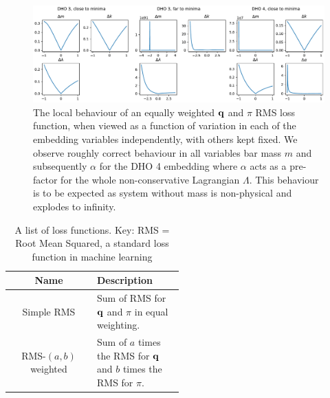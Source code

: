 \begin{figure}[t]
  \label{fig:loss-function-behaviour}
  \includegraphics[width=\textwidth]{figures/loss-function-behaviour.pdf}
  \caption{The local behaviour of an equally weighted $\vb{q}$ and $\pi$ RMS loss function, when viewed as a function of variation in each of the embedding variables independently, with others kept fixed. We observe roughly correct behaviour in all variables bar mass $m$ and subsequently $\alpha$ for the DHO 4 embedding where $\alpha$ acts as a pre-factor for the whole non-conservative Lagrangian $\Lambda$. This behaviour is to be expected as system without mass is non-physical and explodes to infinity.}
\end{figure}

\begin{table}
\label{table:loss-fns}
\centering
\caption{A list of loss functions. Key: RMS = Root Mean Squared, a standard loss function in machine learning%
}
\begin{tabular}{c|p{0.5\linewidth}}
  Name & Description \\
  \hline
  Simple RMS & Sum of RMS for $\vb{q}$ and $\pi$ in equal weighting. \\
  RMS-$(a, b)$ weighted & Sum of $a$ times the RMS for $\vb{q}$ and $b$ times the RMS for $\pi$. \\
\end{tabular}
\end{table}


